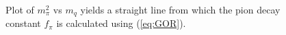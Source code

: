 \begin{figure}[htb]
\caption{Plot of $m_{\pi}^{2}$ vs $m_{q}$ yields a straight line from which the pion decay constant $f_{\pi}$ is calculated using (\ref{eq:GOR}).}
\label{fig:GOR}
\end{figure}

